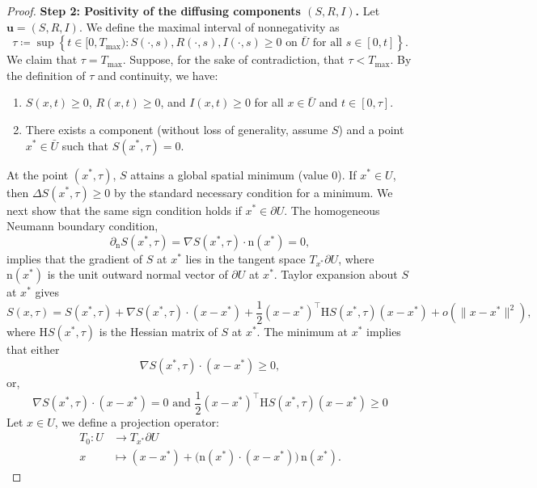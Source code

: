 \documentclass[pdflatex,sn-mathphys-ay]{sn-jnl}
\theoremstyle{thmstyleone}
\theoremstyle{definition}
\theoremstyle{remark}
\begin{document}
\begin{proof}
\smallskip
\noindent\textbf{Step 2: Positivity of the diffusing components $(S,R,I)$.}
Let $\mathbf{u}=(S,R,I)$. We define the maximal interval of nonnegativity as
\begin{equation*}
    \tau\coloneqq \sup\left\{t\in [0,T_{\max}): S(\cdot,s), R(\cdot,s), I(\cdot,s)\ge 0 \text{ on } \bar U \text{ for all } s\in [0,t] \right\}.
\end{equation*}
We claim that $\tau=T_{\max}$. 
Suppose, for the sake of contradiction, that $\tau<T_{\max}$.
By the definition of $\tau$ and continuity, we have:
\begin{enumerate}[label=(\roman*)]
    \item $S(x,t) \ge 0$, $R(x,t)\ge 0$, and $I(x,t)\ge 0$ for all $x\in \bar U$ and $t\in [0,\tau]$.
    \item There exists a component (without loss of generality, assume $S$) and a point $x^*\in \bar U$ such that $S(x^*,\tau)=0$.
\end{enumerate}
At the point $(x^*,\tau)$, $S$ attains a global spatial minimum (value $0$). If $x^*\in U$, then $\Delta S(x^*,\tau)\ge 0$ by the standard necessary condition for a minimum. We next show that the same sign condition holds if $x^*\in \partial U$. The homogeneous Neumann boundary condition,
\[
\partial_{\mathrm n} S(x^*,\tau) = \nabla S(x^*,\tau)\cdot \mathrm n(x^*) = 0,
\]
implies that the gradient of $S$ at $x^*$ lies in the tangent space $T_{x^*}\partial U$, where $\mathrm n(x^*)$ is the unit outward normal vector of $\partial U$ at $x^*$.
Taylor expansion about $S$ at $x^*$ gives
\begin{equation*}
    S(x,\tau) = S(x^*,\tau) + \nabla S(x^*,\tau)\cdot (x-x^*) + \frac{1}{2} (x-x^*)^\top \mathrm{H}S(x^*,\tau) (x-x^*) + o(\lVert x-x^*\rVert ^2), 
\end{equation*}
where $\mathrm{H}S(x^*,\tau)$ is the Hessian matrix of $S$ at $x^*$.
The minimum at $x^*$ implies that either 
\begin{equation}\label{eq:minimum_condition1}
\nabla S(x^*,\tau)\cdot (x-x^*) \ge 0,
\end{equation}
or, 
\begin{equation}\label{eq:minimum_condition2}
\nabla S(x^*,\tau)\cdot (x-x^*) = 0 \text{ and } \frac{1}{2} (x-x^*)^\top \mathrm{H}S(x^*,\tau) (x-x^*)\ge 0
\end{equation}
Let $x\in U$, we define a projection operator:
\begin{align*}
    T_0: U &\to T_{x^*}\partial U \\[4pt]
       x &\mapsto (x-x^*) + \Big(\mathrm n(x^*)\cdot (x-x^*)\Big)\, \mathrm{n}(x^*).

\end{align*}
\end{proof}
\end{document}
